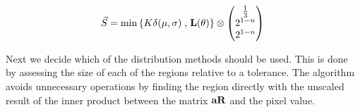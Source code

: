 \begin{equation*}
\Scale =
 \min\left\{K \delta(\mu,\sigma) \right. ,  \left. \mathbf{L}(\theta) \right\}  \otimes
\begin{pmatrix}
  \frac{1}{3} \\
 2^{1-n } \\
 2^{1-n }  \\
\end{pmatrix}    \\
\end{equation*}

Next we decide which of the distribution methods should be used. This is done by assessing the size of each of the regions relative to a tolerance. The algorithm avoids unnecessary operations by finding the region directly with the unscaled result of the inner product between the matrix $\aR$ and the pixel value.
%
%       

